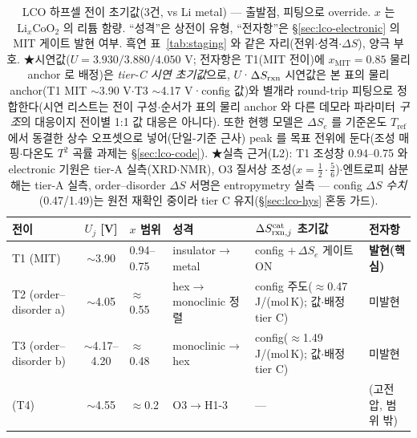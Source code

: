 \begin{table}[t]
\centering\footnotesize
\renewcommand{\arraystretch}{1.3}
\caption{LCO 하프셀 전이 초기값(3건, vs Li metal) --- 출발점, 피팅으로 override. $x$ 는
$\mathrm{Li}_x\mathrm{CoO_2}$ 의 리튬 함량. ``성격''은 상전이 유형, ``전자항''은 \S\ref{sec:lco-electronic} 의 MIT
게이트 발현 여부. 흑연 표~\ref{tab:staging} 와 같은 자리(전위$\cdot$성격$\cdot\Delta S$), 양극 부호.
★시연값($U{=}3.930/3.880/4.050$ V; 전자항은 T1(MIT 전이)에
$x_\mathrm{MIT}{=}0.85$ 물리 anchor 로 배정)은
\emph{tier-C 시연 초기값}으로, $U$·$\Delta S_{\mathrm{rxn}}$ 시연값은 본 표의 물리 anchor(T1 MIT $\sim$3.90 V$\cdot$T3 $\sim$4.17 V·config 값)와
별개라 round-trip 피팅으로 정합한다(시연 리스트는 전이 구성$\cdot$순서가 표의 물리 anchor 와 다른 데모라 파라미터 \emph{구조}의 대응이지 전이별 1:1 값 대응은 아니다). 또한 현행 모델은 $\Delta S_e$ 를 기준온도 $T_\mathrm{ref}$ 에서
동결한 상수 오프셋으로 넣어(단일-기준 근사) peak 를 목표 전위에 둔다(조성 매핑$\cdot$다온도 $T^2$ 곡률
과제는 \S\ref{sec:lco-code}). ★실측 근거(L2): T1 조성창 0.94--0.75 와 electronic 기원은 tier-A
실측\cite{menetrier1999}(XRD$\cdot$NMR), O3 질서상 조성($x{=}\tfrac12\cdot\tfrac56$)$\cdot$엔트로피 삼분해는 tier-A
실측\cite{reynier2004}, order--disorder $\Delta S$ 서명은 entropymetry 실측\cite{kim_entropymetry2020} ---
config $\Delta S$ \emph{수치}(0.47/1.49)는 원전 재확인 중이라 tier C 유지(\S\ref{sec:lco-hys} 혼동 가드).}
\label{tab:lco-staging}
\begin{tabular}{@{}p{} c p{} p{} p{} p{}@{}}
\toprule
전이 & $U_j$ [V] & $x$ 범위 & 성격 & $\Delta S_{\mathrm{rxn},j}^\mathrm{cat}$ 초기값 & 전자항 \\
\midrule
T1 (MIT)              & $\sim$3.90        & 0.94--0.75 & insulator$\to$metal       & config $+\,\Delta S_e$ 게이트 ON & \textbf{발현(핵심)} \\
T2 (order--disorder a)& $\sim$4.05        & $\approx$0.55 & hex$\to$monoclinic 정렬 & config 주도($\approx$0.47 J/(mol\,K); 값$\cdot$배정 tier C) & 미발현 \\
T3 (order--disorder b)& $\sim$4.17--4.20  & $\approx$0.48 & monoclinic$\to$hex      & config($\approx$1.49 J/(mol\,K); 값$\cdot$배정 tier C) & 미발현 \\
\midrule
(T4)                  & $\sim$4.55        & $\approx$0.2 & O3$\to$H1-3              & --- & (고전압, 범위 밖) \\
\bottomrule
\end{tabular}
\end{table}

